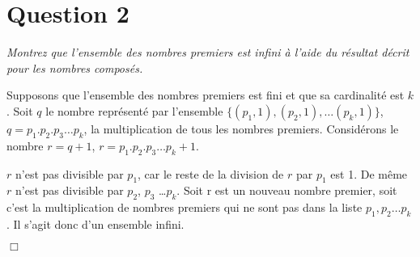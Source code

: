 \section*{Question 2}
\emph{Montrez que l’ensemble des nombres premiers est infini à l’aide du résultat décrit pour les nombres composés.}

\bigskip
Supposons que l’ensemble des nombres premiers est fini et que sa cardinalité est $k$. Soit $q$ le nombre représenté par l’ensemble \( \{(p_1, 1), (p_2, 1), \dots (p_k, 1)\}\), \( q = p_1 . p_2 . p_3 \dots p_k\), la multiplication de tous les nombres premiers. Considérons le nombre \(r = q + 1\), \( r = p_1 . p_2 . p_3 \dots p_k + 1\).

\medskip

$r$ n’est pas divisible par $p_1$, car le reste de la division de $r$ par $p_1$ est 1. De même $r$ n’est pas divisible par $p_2$, $p_3$ \dots $p_k$. Soit r est un \og nouveau \fg{} nombre premier, soit c’est la multiplication de nombres premiers qui ne sont pas dans la liste $p_1, p_2 \dots p_k$. Il s’agit donc d’un ensemble infini.

\begin{flushright}
	$\Box$
\end{flushright} 